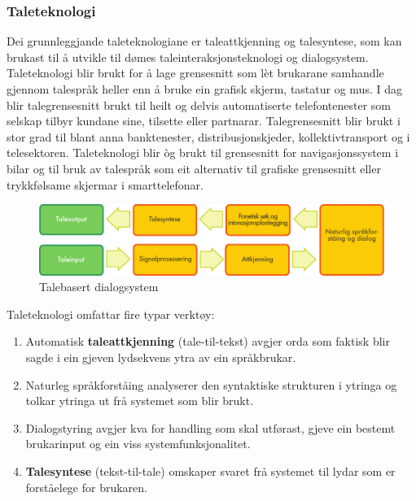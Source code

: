 \begin{multicols}{2}
\subsubsection{Taleteknologi}

Dei grunnleggjande taleteknologiane er taleattkjenning og talesyntese, som kan brukast til å utvikle til dømes taleinteraksjonsteknologi og dialogsystem. Taleteknologi blir brukt for å lage grensesnitt som lèt brukarane samhandle gjennom talespråk heller enn å bruke ein grafisk skjerm, tastatur og mus. I dag blir talegrensesnitt brukt til heilt og delvis automatiserte telefontenester som selskap tilbyr kundane sine, tilsette eller partnarar. Talegrensesnitt blir brukt i stor grad til blant anna banktenester, distribusjonskjeder, kollektivtransport og i telesektoren. Taleteknologi blir òg brukt til grensesnitt for navigasjonssystem i bilar og til bruk av talespråk som eit alternativ til grafiske grensesnitt eller trykkfølsame skjermar i smarttelefonar. 

\begin{figure}[htb]
  \center
  \includegraphics[width=\textwidth]{../_media/norwegian-nynorsk/simple_speech-based_dialogue_architecture}
  \caption{Talebasert dialogsystem}
  \label{fig:dialoguearch_no}
\end{figure}

Taleteknologi omfattar fire typar verktøy: 

\begin{enumerate}
\item Automatisk \textbf{taleattkjenning} (tale-til-tekst) avgjer orda som faktisk blir sagde i ein gjeven lydsekvens ytra av ein språkbrukar.
\item Naturleg språkforståing analyserer den syntaktiske strukturen i ytringa og tolkar ytringa ut frå systemet som blir brukt.
\item Dialogstyring avgjer kva for handling som skal utførast, gjeve ein bestemt brukarinput og ein viss systemfunksjonalitet.
\item \textbf{Talesyntese} (tekst-til-tale) omskaper svaret frå systemet til lydar som er forståelege for brukaren.
\end{enumerate}


\end{multicols}
